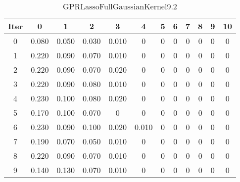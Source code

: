 \begin{table}
	\begin{center}
		\begin{tabular}{|c|c|c|c|c|c|c|c|c|c|c|c|}
			\hline
			Iter & 0 & 1 & 2 & 3 & 4 & 5 & 6 & 7 & 8 & 9 & 10 \\
			\hline
			0 & 0.080 & 0.050 & 0.030 & 0.010 & 0 & 0 & 0 & 0 & 0 & 0 & 0 \\
			\hline
			1 & 0.220 & 0.090 & 0.070 & 0.010 & 0 & 0 & 0 & 0 & 0 & 0 & 0 \\
			\hline
			2 & 0.220 & 0.090 & 0.070 & 0.020 & 0 & 0 & 0 & 0 & 0 & 0 & 0 \\
			\hline
			3 & 0.220 & 0.090 & 0.080 & 0.010 & 0 & 0 & 0 & 0 & 0 & 0 & 0 \\
			\hline
			4 & 0.230 & 0.100 & 0.080 & 0.020 & 0 & 0 & 0 & 0 & 0 & 0 & 0 \\
			\hline
			5 & 0.170 & 0.100 & 0.070 & 0 & 0 & 0 & 0 & 0 & 0 & 0 & 0 \\
			\hline
			6 & 0.230 & 0.090 & 0.100 & 0.020 & 0.010 & 0 & 0 & 0 & 0 & 0 & 0 \\
			\hline
			7 & 0.190 & 0.070 & 0.050 & 0.010 & 0 & 0 & 0 & 0 & 0 & 0 & 0 \\
			\hline
			8 & 0.220 & 0.090 & 0.070 & 0.010 & 0 & 0 & 0 & 0 & 0 & 0 & 0 \\
			\hline
			9 & 0.140 & 0.130 & 0.070 & 0.010 & 0 & 0 & 0 & 0 & 0 & 0 & 0 \\
			\hline
		\end{tabular}
	\end{center}
	\caption{GPRLassoFullGaussianKernel9.2}
\end{table}